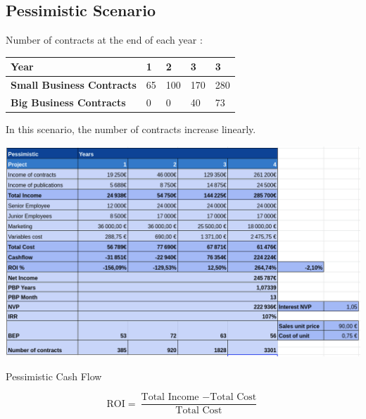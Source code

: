 \documentclass[./main.tex]{subfiles}
\begin{document}
\subsection{Pessimistic Scenario}
Number of contracts at the end of each year : 
\begin{table}[H]
	\centering
\begin{tabular}{|l|l|l|l|l|}
\hline
\textbf{Year}                     & 1  & 2   & 3   & 3   \\ \hline
\textbf{Small Business Contracts} & 65 & 100 & 170 & 280 \\ \hline
\textbf{Big Business Contracts}   & 0  & 0   & 40  & 73  \\ \hline
\end{tabular}
\end{table}
In this scenario, the number of contracts increase linearly.
\begin{table}[H]
	\centering
	\includegraphics[width=14cm]{img/pessimistic.png}
	\caption{Pessimistic Cash Flow}
	\label{tab:pessimistic}
\end{table}
\[
\textrm{ROI} = \frac{\textrm{Total Income }- \textrm{Total Cost}}{\textrm{Total Cost}}
\]
\end{document}
